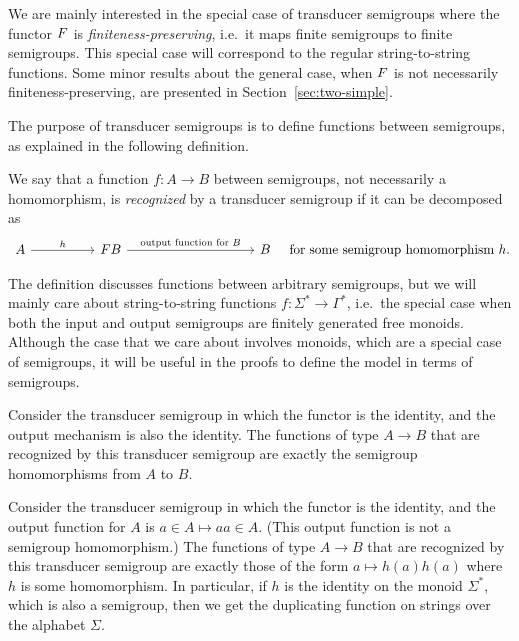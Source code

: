 We are mainly interested in the special case of transducer semigroups where the functor $\functor$ is \emph{finiteness-preserving}, i.e.~it maps finite semigroups to finite semigroups. This special case will correspond to the regular string-to-string functions. Some minor results about the general case, when $\functor$ is not necessarily finiteness-preserving, are presented in Section~\ref{sec:two-simple}.

The purpose of transducer semigroups is to define functions between semigroups, as explained in the following definition. 
\begin{definition}
 We say that a function $f : A \to B$ between semigroups, not necessarily a homomorphism, is \emph{recognized} by a transducer semigroup if it can be decomposed as
 \[
 \begin{tikzcd}
 [column sep=1.7cm]
 A 
 \ar[r,"h"]
 &
 \functor B
 \ar[rr,"\text{output function for $B$}"]
 &&
 B
 \end{tikzcd}
 \quad
 \text{for some semigroup homomorphism}\ h.
 \]
\end{definition}


The definition discusses functions between arbitrary semigroups, but we will mainly care about string-to-string functions $f : \Sigma^* \to \Gamma^*$, i.e.~the special case when both the input and output semigroups are finitely generated free monoids. Although the case that we care about involves monoids, which are a special case of semigroups, it will be useful in the proofs to define the model in terms of semigroups.

\begin{example}
 Consider the transducer semigroup in which the functor is the identity, and the output mechanism is also the identity. The functions of type $A \to B$ that are recognized by this transducer semigroup are exactly the semigroup homomorphisms from $A$ to $B$.
\end{example}

\begin{example}\label{ex:duplicator}
 Consider the transducer semigroup in which the functor is the identity, and the output function for $A$ is $a \in A \mapsto aa \in A$. (This output function is not a semigroup homomorphism.)
 The functions of type $A \to B$ that are recognized by this transducer semigroup are exactly those of the form $a \mapsto h(a)h(a)$ where $h$ is some homomorphism. In particular, if $h$ is the identity on the monoid $\Sigma^*$, which is also a semigroup, then we get the duplicating function on strings over the alphabet $\Sigma$.
\end{example}



